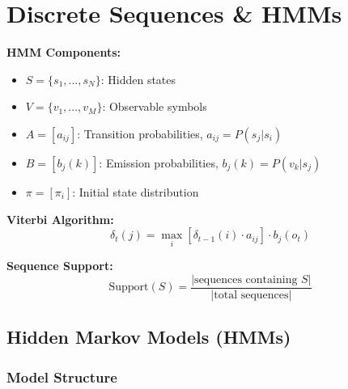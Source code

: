 
\chapter{Discrete Sequences \& HMMs}

\begin{formulabox}
\textbf{HMM Components:}
\begin{itemize}
    \item $S = \{s_1, ..., s_N\}$: Hidden states
    \item $V = \{v_1, ..., v_M\}$: Observable symbols
    \item $A = [a_{ij}]$: Transition probabilities, $a_{ij} = P(s_j | s_i)$
    \item $B = [b_j(k)]$: Emission probabilities, $b_j(k) = P(v_k | s_j)$
    \item $\pi = [\pi_i]$: Initial state distribution
\end{itemize}

\textbf{Viterbi Algorithm:}
\[
\delta_t(j) = \max_{i} \left[ \delta_{t-1}(i) \cdot a_{ij} \right] \cdot b_j(o_t)
\]

\textbf{Sequence Support:}
\[
\text{Support}(S) = \frac{|\text{sequences containing } S|}{|\text{total sequences}|}
\]
\end{formulabox}

\section{Hidden Markov Models (HMMs)}

\subsection{Model Structure}

